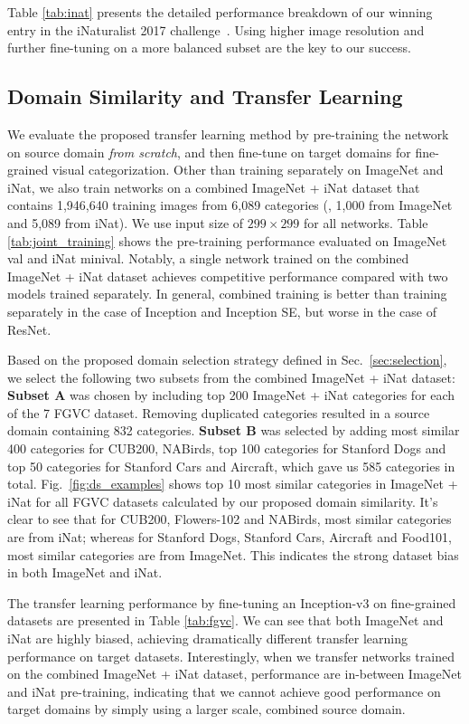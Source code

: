 \documentclass[10pt,twocolumn,letterpaper]{article}
\begin{document}
Table \ref{tab:inat} presents the detailed performance breakdown of our winning entry in the iNaturalist 2017 challenge~\cite{inatchallenge}.
Using higher image resolution and further fine-tuning on a more balanced subset are the key to our success.




\subsection{Domain Similarity and Transfer Learning}
\label{sec:exp_fgvc}

We evaluate the proposed transfer learning method by pre-training the network on source domain \textit{from scratch}, and then fine-tune on target domains for fine-grained visual categorization.
Other than training separately on ImageNet and iNat, we also train networks on a combined ImageNet + iNat dataset that contains 1,946,640 training images from 6,089 categories (\ie, 1,000 from ImageNet and 5,089 from iNat).
We use input size of $299 \times 299$ for all networks.
Table \ref{tab:joint_training} shows the pre-training performance evaluated on ImageNet val and iNat minival.
Notably, a single network trained on the combined ImageNet + iNat dataset achieves competitive performance compared with two models trained separately. In general, combined training is better than training separately in the case of Inception and Inception SE, but worse in the case of ResNet.

Based on the proposed domain selection strategy defined in Sec.\ \ref{sec:selection}, we select the following two subsets from the combined ImageNet + iNat dataset:
\textbf{Subset A} was chosen by including top 200 ImageNet + iNat categories for each of the 7 FGVC dataset.
Removing duplicated categories resulted in a source domain containing 832 categories.
\textbf{Subset B} was selected by adding most similar 400 categories for CUB200, NABirds, top 100 categories for Stanford Dogs and top 50 categories for Stanford Cars and Aircraft, which gave us 585 categories in total.
Fig.\ \ref{fig:ds_examples} shows top 10 most similar categories in ImageNet + iNat for all FGVC datasets calculated by our proposed domain similarity.
It's clear to see that for CUB200, Flowers-102 and NABirds, most similar categories are from iNat; whereas for Stanford Dogs, Stanford Cars, Aircraft and Food101, most similar categories are from ImageNet.
This indicates the strong dataset bias in both ImageNet and iNat.

The transfer learning performance by fine-tuning an Inception-v3 on fine-grained datasets are presented in Table \ref{tab:fgvc}.
We can see that both ImageNet and iNat are highly biased, achieving dramatically different transfer learning performance on target datasets.
Interestingly, when we transfer networks trained on the combined ImageNet + iNat dataset, performance are in-between ImageNet and iNat pre-training, indicating that we cannot achieve good performance on target domains by simply using a larger scale, combined source domain.
\end{document}
